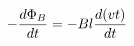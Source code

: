 \documentclass[preview]{standalone}
\begin{document}
\begin{align*}
- {d \Phi_B \over d t}  = - B l {d( vt )  \over dt}
\end{align*}
\end{document}
